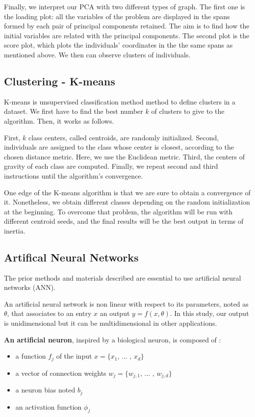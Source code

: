 Finally, we interpret our PCA with two different types of graph. The first one is the loading plot: all the variables of the problem are displayed in the spans formed by each pair of principal components retained. The aim is to find how the initial variables are related with the principal components. The second plot is the score plot, which plots the individuals' coordinates in the the same spans as mentioned above. We then can observe clusters of individuals.

\subsection{Clustering - K-means}

K-means is unsupervised classification method method to define clusters in a dataset. We first have to find the best number $k$ of clusters to give to the algorithm. Then, it works as follows.

First, $k$ class centers, called centroids, are randomly initialized. Second, individuals are assigned to the class whose center is closest, according to the chosen distance metric. Here, we use the Euclidean metric. Third, the centers of gravity of each class are computed. Finally, we repeat second and third instructions until the algorithm's convergence.

One edge of the K-means algorithm is that we are sure to obtain a convergence of it. Nonetheless, we obtain different classes depending on the random initialization at the beginning. To overcome that problem, the algorithm will be run with different centroid seeds, and the final results will be the best output in terms of inertia.
 
\subsection{Artifical Neural Networks}

The prior methods and materials described are essential to use artificial neural networks (ANN). 

An artificial neural network is non linear with respect to its parameters, noted as $\theta$, that associates to an entry $x$ an output $y = f (x, \theta)$. In this study, our output is unidimensional but it can be multidimensional in other applications. \newline

\textbf{An artificial neuron}, inspired by a biological neuron, is composed of : 
\begin{itemize}
    \item[\textbullet] a function $f_j$ of the input $x = \{x_1 \mbox{, ... , }x_d\}$
    \item[\textbullet] a vector of connection weights $w_j = \{w_{j,1} \mbox{, ... , } w_{j,d}\}$
    \item[\textbullet] a neuron bias noted $b_j$
    \item[\textbullet] an activation function $\phi_j$
\end{itemize}

